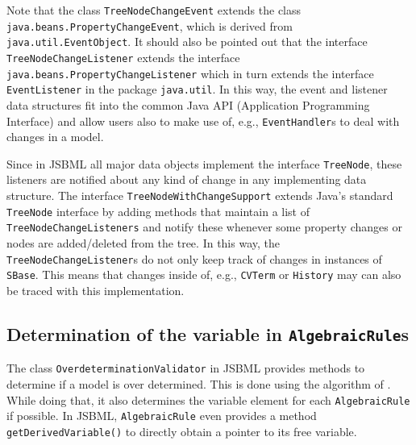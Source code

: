 Note that the class
\texttt{TreeNodeChangeEvent} extends
the class \texttt{java.beans.Property\-Change\-Event},%
which is derived from 
\texttt{java.util.EventObject}.
It should also be pointed out that the interface
\texttt{TreeNodeChangeListener}%
extends the interface \texttt{java.beans.Pro\-perty\-Change\-Listener}
which in turn extends the interface \texttt{EventListener}%
in the package \texttt{java.util}. In this way, the event and listener data
structures fit into the common Java\texttrademark{} API (Application
Programming Interface) and allow
users also to make use of, e.g.,
\texttt{EventHandler}s to deal with changes
in a model. 

Since in JSBML all major data objects implement the interface \texttt{TreeNode},
these listeners are notified about any kind of change in any implementing data
structure. The interface \texttt{TreeNodeWithChangeSupport} extends Java's
standard \texttt{TreeNode} interface by adding methods that maintain a list of
\texttt{TreeNodeChangeListeners} and notify these whenever some property changes
or nodes are added/deleted from the tree. In this way, the
\texttt{TreeNodeChangeListener}s do not only keep track of changes in instances
of \texttt{SBase}. This means that changes inside of, e.g.,
\texttt{CVTerm} or
\texttt{History} may can also be traced with
this implementation.


\subsection{Determination of the variable in \texttt{AlgebraicRule}s}

The class \texttt{OverdeterminationValidator}
%
in JSBML provides methods to
determine if a model
is over determined. This is done using the algorithm of \citet{Hopcroft1973}.
While doing that, it also determines the variable element for each
\texttt{AlgebraicRule} if
possible. In JSBML, \texttt{AlgebraicRule} even provides a method
\texttt{getDerivedVariable()} to directly obtain a pointer to its free variable.


